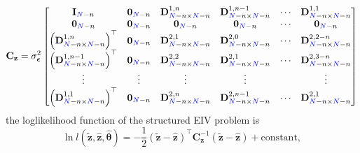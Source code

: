 \begin{equation} \mathbf{C}_{\mathbf{z}} = \sigma_{\bm{\epsilon}}^2 
\begin{bmatrix} \mathbf{I}_{\color{blue}N\color{black}-n} & \mathbf{0}_{\color{blue}N\color{black}-n} & \mathbf{D}^{1,n}_{\color{blue}N\color{black}-n \times \color{blue}N\color{black}-n} & \mathbf{D}^{1,n-1}_{\color{blue}N\color{black}-n \times \color{blue}N\color{black}-n} & \cdots & \mathbf{D}^{1,1}_{\color{blue}N\color{black}-n \times \color{blue}N\color{black}-n} \\ \mathbf{0}_{\color{blue}N\color{black}-n} & \mathbf{0}_{\color{blue}N\color{black}-n} & \mathbf{0}_{\color{blue}N\color{black}-n} & \mathbf{0}_{\color{blue}N\color{black}-n} & \cdots & \mathbf{0}_{\color{blue}N\color{black}-n} \\ \left( \mathbf{D}^{1,n}_{\color{blue}N\color{black}-n \times \color{blue}N\color{black}-n} \right)^\top & \mathbf{0}_{\color{blue}N\color{black}-n} & \mathbf{D}^{2,1}_{\color{blue}N\color{black}-n \times \color{blue}N\color{black}-n} & \mathbf{D}^{2,0}_{\color{blue}N\color{black}-n \times \color{blue}N\color{black}-n} & \cdots & \mathbf{D}^{2,2-n}_{\color{blue}N\color{black}-n \times \color{blue}N\color{black}-n} \\ \left( \mathbf{D}^{1,n-1}_{\color{blue}N\color{black}-n \times \color{blue}N\color{black}-n} \right)^\top & \mathbf{0}_{\color{blue}N\color{black}-n} & \mathbf{D}^{2,2}_{\color{blue}N\color{black}-n \times \color{blue}N\color{black}-n} & \mathbf{D}^{2,1}_{\color{blue}N\color{black}-n \times \color{blue}N\color{black}-n} & \cdots & \mathbf{D}^{2,3-n}_{\color{blue}N\color{black}-n \times \color{blue}N\color{black}-n} \\ \vdots & \vdots & \vdots & \vdots & & \vdots \\ \left( \mathbf{D}^{1,1}_{\color{blue}N\color{black}-n \times \color{blue}N\color{black}-n} \right)^\top & \mathbf{0}_{\color{blue}N\color{black}-n} & \mathbf{D}^{2,n}_{\color{blue}N\color{black}-n \times \color{blue}N\color{black}-n} & \mathbf{D}^{2,n-1}_{\color{blue}N\color{black}-n \times \color{blue}N\color{black}-n} & \cdots & \mathbf{D}^{2,1}_{\color{blue}N\color{black}-n \times \color{blue}N\color{black}-n} \end{bmatrix} \label{eqn:Cz} \end{equation} 
the loglikelihood function of the structured EIV problem is
\begin{equation} \ln{ l(\widetilde{\mathbf{z}}, \widehat{\mathbf{z}}, \widehat{\bm{\theta}}) } = - \frac{1}{2} \left( \widetilde{\mathbf{z}} - \widehat{\mathbf{z}} \right)^\top \mathbf{C}_{\mathbf{z}}^{-1} \left( \widetilde{\mathbf{z}} - \widehat{\mathbf{z}} \right) + \mathrm{constant}, \end{equation}

